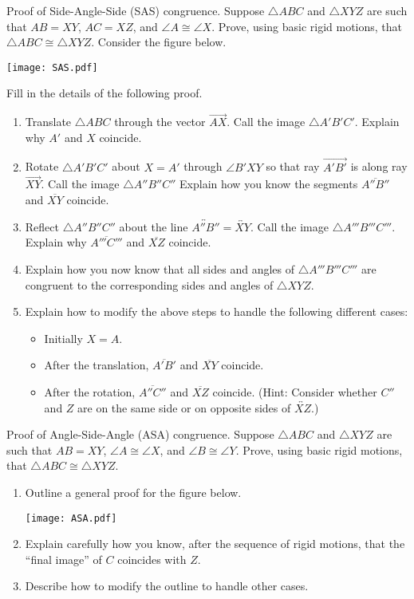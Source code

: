 \documentclass[nooutcomes]{ximera}
\begin{document}
\begin{problem}
Proof of Side-Angle-Side (SAS) congruence.  Suppose $\triangle ABC$ and $\triangle XYZ$ are such that $AB=XY$, $AC=XZ$, and $\angle A \cong \angle X$.  Prove, using basic rigid motions, that $\triangle ABC \cong \triangle XYZ$.  Consider the figure below.  
\begin{image}
\texttt{[image: SAS.pdf]}
\end{image}
Fill in the details of the following proof.  
\begin{enumerate}
\item Translate $\triangle ABC$ through the vector $\overrightarrow{AX}$.  Call the image $\triangle A'B'C'$.  Explain why $A'$ and $X$ coincide.
\item Rotate $\triangle A'B'C'$ about $X=A'$ through $\angle B'XY$ so that ray $\overrightarrow{A'B'}$ is along ray $\overrightarrow{XY}$.  Call the image $\triangle A''B''C''$   Explain how you know the segments $\overline{A''B''}$ and $\overline{XY}$ coincide. 
\item Reflect $\triangle A''B''C''$ about the line $\overleftrightarrow{A''B''} = \overleftrightarrow{XY}$.  Call the image $\triangle A'''B'''C'''$.  Explain why $\overline{A'''C'''}$ and $\overline{XZ}$ coincide.
\item Explain how you now know that all sides and angles of $\triangle A'''B'''C'''$ are congruent to the corresponding sides and angles of $\triangle XYZ$.  
\item Explain how to modify the above steps to handle the following different cases: 
\begin{itemize}
\item Initially $X = A$. 
\item After the translation, $\overline{A'B'}$ and $\overline{XY}$ coincide. 
\item After the rotation, $\overline{A''C''}$ and $\overline{XZ}$ coincide.  (Hint:  Consider whether $C''$ and $Z$ are on the same side or on opposite sides of $\overleftrightarrow{XZ}$.)  
\end{itemize}
\end{enumerate}
\end{problem}

\begin{problem}
Proof of Angle-Side-Angle (ASA) congruence.  Suppose $\triangle ABC$ and $\triangle XYZ$ are such that $AB=XY$, $\angle A \cong \angle X$, and $\angle B \cong \angle Y$.  Prove, using basic rigid motions, that $\triangle ABC \cong \triangle XYZ$.  
\begin{enumerate}
\item Outline a general proof for the figure below.  
\begin{image}
\texttt{[image: ASA.pdf]}
\end{image}
\item Explain carefully how you know, after the sequence of rigid motions, that the ``final image'' of $C$ coincides with $Z$.  
\item Describe how to modify the outline to handle other cases. 
\end{enumerate}
\end{problem}
\end{document}
